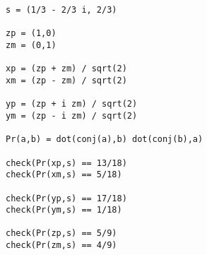 
{\footnotesize\begin{verbatim}
s = (1/3 - 2/3 i, 2/3)

zp = (1,0)
zm = (0,1)

xp = (zp + zm) / sqrt(2)
xm = (zp - zm) / sqrt(2)

yp = (zp + i zm) / sqrt(2)
ym = (zp - i zm) / sqrt(2)

Pr(a,b) = dot(conj(a),b) dot(conj(b),a)

check(Pr(xp,s) == 13/18)
check(Pr(xm,s) == 5/18)

check(Pr(yp,s) == 17/18)
check(Pr(ym,s) == 1/18)

check(Pr(zp,s) == 5/9)
check(Pr(zm,s) == 4/9)
\end{verbatim}}

